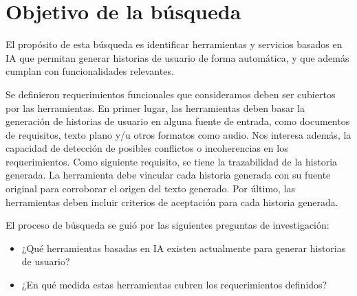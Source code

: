 \section{Objetivo de la búsqueda}
El propósito de esta búsqueda es identificar herramientas y servicios basados en IA que permitan generar historias de usuario de forma automática, y que además cumplan con funcionalidades relevantes.

Se definieron requerimientos funcionales que consideramos deben ser cubiertos por las herramientas. En primer lugar, las herramientas deben basar la generación de historias de usuario en alguna fuente de entrada, como documentos de requisitos, texto plano y/u otros formatos como audio. Nos interesa además, la capacidad de detección de posibles conflictos o incoherencias en los requerimientos. %
Como siguiente requisito, se tiene la trazabilidad de la historia generada. La herramienta debe vincular cada historia generada con su fuente original para corroborar el origen del texto generado. Por último, las herramientas deben incluir criterios de aceptación para cada historia generada.

El proceso de búsqueda se guió por las siguientes preguntas de investigación:
\begin{itemize}
    \item ¿Qué herramientas basadas en IA existen actualmente para generar historias de usuario?
    \item ¿En qué medida estas herramientas cubren los requerimientos definidos?
\end{itemize}


